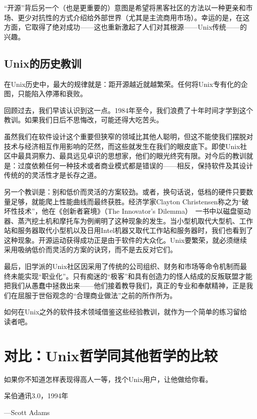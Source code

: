 \documentclass[12pt,oneside]{ctexbook}
\begin{document}
\begin{common-format}
“开源”背后另一个（也是更重要的）意图是希望将黑客社区的方法以一种更亲和市场、更少对抗性的方式介绍给外部世界（尤其是主流商用市场）。幸运的是，在这方面，它取得了绝对成功——这也重新激起了人们对其根源——Unix传统——的兴趣。

\section{Unix的历史教训}
在Unix历史中，最大的规律就是：距开源越近就越繁荣。任何将Unix专有化的企图，只能陷入停滞和衰败。

回顾过去，我们早该认识到这一点。1984年至今，我们浪费了十年时间才学到这个教训。如果我们日后不思悔改，可能还得大吃苦头。

虽然我们在软件设计这个重要但狭窄的领域比其他人聪明，但这不能使我们摆脱对技术与经济相互作用影响的茫然，而这些就发生在我们的眼皮底下。即使Unix社区中最具洞察力、最具远见卓识的思想家，他们的眼光终究有限。对今后的教训就是：过度依赖任何一种技术或者商业模式都是错误的——相反，保持软件及其设计传统的的灵活性才是长存之道。

另一个教训是：别和低价而灵活的方案较劲。或者，换句话说，低档的硬件只要数量足够，就能爬上性能曲线而最终获胜。经济学家Clayton Christensen称之为“破坏性技术”，他在《创新者窘境》（The Innovator's Dilemma）~\cite{Christensen}一书中以磁盘驱动器、蒸汽挖土机和摩托车为例阐明了这种现象的发生。当小型机取代大型机、工作站和服务器取代小型机以及日用Intel机器又取代工作站和服务器时，我们也看到了这种现象。开源运动获得成功正是由于软件的大众化。Unix要繁荣，就必须继续采用吸纳低价而灵活的方案的诀窍，而不是去反对它们。

最后，旧学派的Unix社区因采用了传统的公司组织、财务和市场等命令机制而最终未能实现“职业化”。只有痴迷的“极客”和具有创造力的怪人结成的反叛联盟才能把我们从愚蠢中拯救出来——他们接着教导我们，真正的专业和奉献精神，正是我们在屈服于世俗观念的“合理商业做法”之前的所作所为。

如何在Unix之外的软件技术领域借鉴这些经验教训，就作为一个简单的练习留给读者吧。




\chapter{对比：Unix哲学同其他哲学的比较}
\begin{flushright}
\begin{notecard}{18em}
如果你不知道怎样表现得高人一等，找个Unix用户，让他做给你看。

{\hfill 呆伯通讯3.0，1994年}

{\hfill —Scott Adams}
\end{notecard}
\end{flushright}


\end{common-format}
\end{document}
